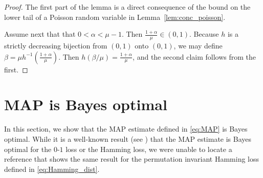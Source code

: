 \documentclass[letterpaper,11pt]{article}
\theoremstyle{definition}
\numberwithin{equation}{section}
\newcommand{\al}{\alpha}
\newcommand{\be}{\beta}
\theoremstyle{definition}
\numberwithin{equation}{section}
\newcommand{\al}{\alpha}
\newcommand{\be}{\beta}
\theoremstyle{thmstyletwo}%
\begin{document}
\begin{appendices}
\begin{proof}
The first part of the lemma is a direct consequence of the bound on the lower tail of a Poisson random variable in Lemma~\ref{lem:conc_poisson}.

Assume next that that $0 < \al <\mu-1$.
Then $\frac{1+\al}{\mu} \in (0,1)$. Because $h$ is a strictly decreasing
bijection from $(0,1)$ onto $(0,1)$, we may define
$\be = \mu h^{-1}( \frac{1+\al}{\mu} )$.
Then $h(\be/\mu) = \frac{1+\al}{\mu}$,
and the second claim follows from the first.
\end{proof}


\section{MAP is Bayes optimal }
\label{app:MAP_Bayes_opt}
In this section, we show that the MAP estimate defined in \eqref{eq:MAP} is Bayes optimal. While it is a well-known result (see \cite[Section 5.7.1]{murphy2012machine}) that the MAP estimate is Bayes optimal for the $0$-$1$ loss or the Hamming loss, we were unable to locate a reference that shows the same result for the permutation invariant Hamming loss defined in \eqref{eq:Hamming_dist}. 


\end{appendices}
\end{document}
